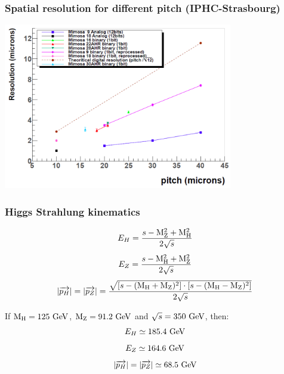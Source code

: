 \documentclass{beamer}
\begin{document}

  \begin{frame}[plain]
    \frametitle{Spatial resolution for different pitch (IPHC-Strasbourg)}

    \vspace{-0.3cm}
    \begin{center}
        \includegraphics[width = 10cm]{Pictures/resolution_pitch_10to40_withBinary.png}
    \end{center}
  \end{frame}


  \begin{frame}[plain]
    \frametitle{Higgs Strahlung kinematics}

    \[ E_H = \frac{s - \rm{M}_Z^2 + \rm{M}_H^2}{2\sqrt{s}} \]
    \[ E_Z = \frac{s - \rm{M}_H^2 + \rm{M}_Z^2}{2\sqrt{s}} \]
    \[ | \overrightarrow{p_H} | = | \overrightarrow{p_Z} | = \frac{\sqrt{\left[ s - (\rm{M}_H + \rm{M}_Z)^2 \right] \cdot \left[s - (\rm{M}_H - \rm{M}_Z)^2 \right]}}{2\sqrt{s}} \]

    If $\rm{M}_H = 125~\rm{GeV}$, $\rm{M}_Z = 91.2~\rm{GeV}$ and $\sqrt{s} = 350~\rm{GeV}$, then:
    \[ E_H \simeq 185.4~\rm{GeV} \]
    \[ E_Z \simeq 164.6~\rm{GeV} \]
    \[  | \overrightarrow{p_H} | = | \overrightarrow{p_Z} | \simeq 68.5~\rm{GeV}\]

  \end{frame}
\end{document}
